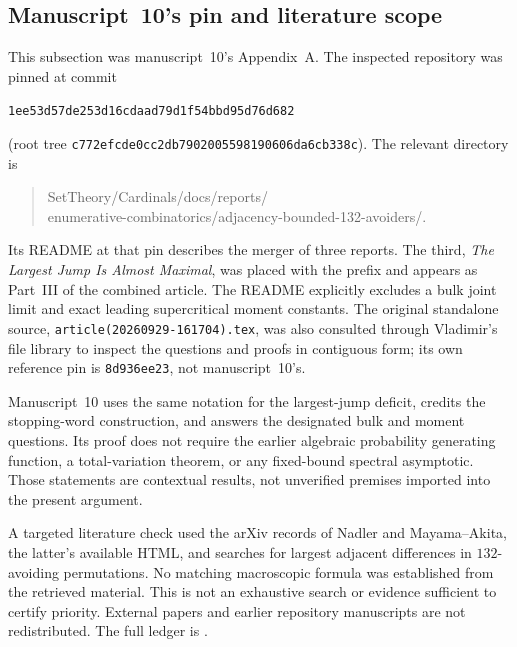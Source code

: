 \documentclass[11pt,a4paper]{article}
\theoremstyle{definition}\newaliascnt{definition}{theorem}
\theoremstyle{remark}\newaliascnt{remark}{theorem}
\begin{document}
\subsection{Manuscript~10's pin and literature scope}
This subsection was manuscript~10's Appendix~A. The inspected repository was
pinned at commit
\begin{center}\small\texttt{1ee53d57de253d16cdaad79d1f54bbd95d76d682}\end{center}
(root tree \texttt{c772efcde0cc2db7902005598190606da6cb338c}). The relevant
directory is
\begin{quote}\small\ttfamily
SetTheory/Cardinals/docs/reports/\\
enumerative-combinatorics/adjacency-bounded-132-avoiders/.
\end{quote}
Its README at that pin describes the merger of three reports. The third,
\emph{The Largest Jump Is Almost Maximal}, was placed with the
 prefix and appears as Part~III of the combined
article. The README explicitly excludes a bulk joint limit and exact leading
supercritical moment constants. The original standalone source,
\texttt{article(20260929-161704).tex}, was also consulted through
Vladimir's file library to inspect the questions and proofs in contiguous
form; its own reference pin is \texttt{8d936ee23}, not manuscript~10's.

Manuscript~10 uses the same notation for the largest-jump deficit, credits the
stopping-word construction, and answers the designated bulk and moment
questions. Its proof does not require the earlier algebraic probability
generating function, a total-variation theorem, or any fixed-bound spectral
asymptotic. Those statements are contextual results, not unverified premises
imported into the present argument.

A targeted literature check used the arXiv records of Nadler and
Mayama--Akita, the latter's available HTML, and searches for largest adjacent
differences in $132$-avoiding permutations. No matching macroscopic formula
was established from the retrieved material. This is not an exhaustive
search or evidence sufficient to certify priority. External papers and
earlier repository manuscripts are not redistributed. The full ledger is
.
\end{document}
